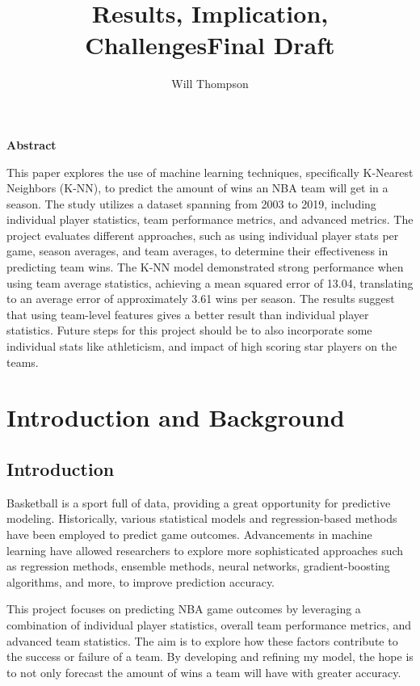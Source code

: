 \documentclass[11pt]{article}
\title{Results, Implication, Challenges}
\title{Final Draft}
\author{Will Thompson}
\begin{document}
\maketitle

\begin{center}
  \textbf{Abstract}  


This paper explores the use of machine learning techniques, specifically K-Nearest Neighbors (K-NN), to predict the amount of wins an NBA team will get in a season. The study utilizes a dataset spanning from 2003 to 2019, including individual player statistics, team performance metrics, and advanced metrics. The project evaluates different approaches, such as using individual player stats per game, season averages, and team averages, to determine their effectiveness in predicting team wins. The K-NN model demonstrated strong performance when using team average statistics, achieving a mean squared error of 13.04, translating to an average error of approximately 3.61 wins per season. The results suggest that using team-level features gives a better result than individual player statistics. Future steps for this project should be to also incorporate some individual stats like athleticism, and impact of high scoring star players on the teams.
\end{center}   

\section{Introduction and Background}

\subsection{Introduction}Basketball is a sport full of data, providing a great opportunity for predictive modeling. Historically, various statistical models and regression-based methods have been employed to predict game outcomes. Advancements in machine learning have allowed researchers to explore more sophisticated approaches such as regression methods, ensemble methods, neural networks, gradient-boosting algorithms, and more, to improve prediction accuracy.

\medskip

This project focuses on predicting NBA game outcomes by leveraging a combination of individual player
statistics, overall team performance metrics, and advanced team statistics. The aim is to explore how
these factors contribute to the success or failure of a team. By developing and refining my model, the hope is to not only forecast the amount of wins a team will have with greater accuracy.
\end{document}
